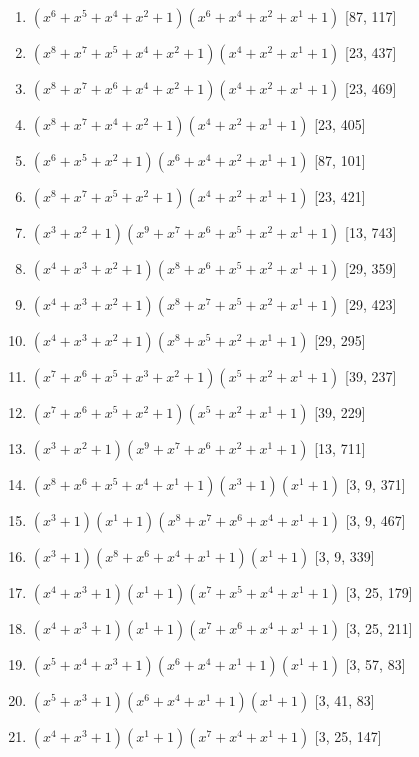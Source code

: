 \documentclass[10pt,twocolumn]{article}
\begin{document}
\begin{enumerate}
\item $(x^{6} + x^{5} + x^{4} + x^{2} + 1)(x^{6} + x^{4} + x^{2} + x^{1} + 1)$  [87, 117]
\item $(x^{8} + x^{7} + x^{5} + x^{4} + x^{2} + 1)(x^{4} + x^{2} + x^{1} + 1)$  [23, 437]
\item $(x^{8} + x^{7} + x^{6} + x^{4} + x^{2} + 1)(x^{4} + x^{2} + x^{1} + 1)$  [23, 469]
\item $(x^{8} + x^{7} + x^{4} + x^{2} + 1)(x^{4} + x^{2} + x^{1} + 1)$  [23, 405]
\item $(x^{6} + x^{5} + x^{2} + 1)(x^{6} + x^{4} + x^{2} + x^{1} + 1)$  [87, 101]
\item $(x^{8} + x^{7} + x^{5} + x^{2} + 1)(x^{4} + x^{2} + x^{1} + 1)$  [23, 421]
\item $(x^{3} + x^{2} + 1)(x^{9} + x^{7} + x^{6} + x^{5} + x^{2} + x^{1} + 1)$  [13, 743]
\item $(x^{4} + x^{3} + x^{2} + 1)(x^{8} + x^{6} + x^{5} + x^{2} + x^{1} + 1)$  [29, 359]
\item $(x^{4} + x^{3} + x^{2} + 1)(x^{8} + x^{7} + x^{5} + x^{2} + x^{1} + 1)$  [29, 423]
\item $(x^{4} + x^{3} + x^{2} + 1)(x^{8} + x^{5} + x^{2} + x^{1} + 1)$  [29, 295]
\item $(x^{7} + x^{6} + x^{5} + x^{3} + x^{2} + 1)(x^{5} + x^{2} + x^{1} + 1)$  [39, 237]
\item $(x^{7} + x^{6} + x^{5} + x^{2} + 1)(x^{5} + x^{2} + x^{1} + 1)$  [39, 229]
\item $(x^{3} + x^{2} + 1)(x^{9} + x^{7} + x^{6} + x^{2} + x^{1} + 1)$  [13, 711]
\item $(x^{8} + x^{6} + x^{5} + x^{4} + x^{1} + 1)(x^{3} + 1)(x^{1} + 1)$  [3, 9, 371]
\item $(x^{3} + 1)(x^{1} + 1)(x^{8} + x^{7} + x^{6} + x^{4} + x^{1} + 1)$  [3, 9, 467]
\item $(x^{3} + 1)(x^{8} + x^{6} + x^{4} + x^{1} + 1)(x^{1} + 1)$  [3, 9, 339]
\item $(x^{4} + x^{3} + 1)(x^{1} + 1)(x^{7} + x^{5} + x^{4} + x^{1} + 1)$  [3, 25, 179]
\item $(x^{4} + x^{3} + 1)(x^{1} + 1)(x^{7} + x^{6} + x^{4} + x^{1} + 1)$  [3, 25, 211]
\item $(x^{5} + x^{4} + x^{3} + 1)(x^{6} + x^{4} + x^{1} + 1)(x^{1} + 1)$  [3, 57, 83]
\item $(x^{5} + x^{3} + 1)(x^{6} + x^{4} + x^{1} + 1)(x^{1} + 1)$  [3, 41, 83]
\item $(x^{4} + x^{3} + 1)(x^{1} + 1)(x^{7} + x^{4} + x^{1} + 1)$  [3, 25, 147]

\end{enumerate}
\end{document}
